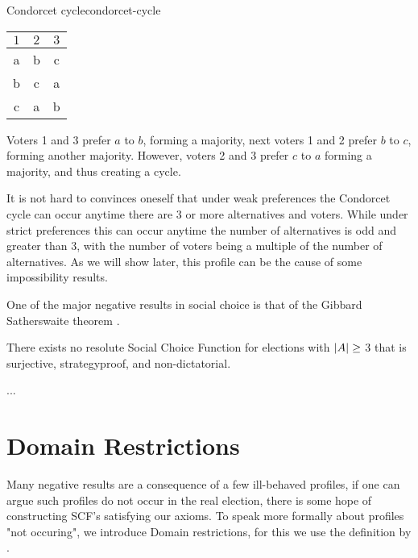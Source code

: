 \begin{example}{Condorcet cycle}{condorcet-cycle}
	\begin{minipage}{0.15\linewidth}
		\begin{tabular}{ccc}
			\toprule
			$1$ & $2$ & $3$ \\
			\midrule
			a   & b   & c   \\
			b   & c   & a   \\
			c   & a   & b   \\
			\bottomrule
		\end{tabular}
	\end{minipage}
	\hspace{0.02\linewidth}
	\begin{minipage}{0.78\linewidth}
		Voters 1 and 3  prefer $a$ to $b$, forming a majority, next voters 1 and 2 prefer $b$ to $c$, forming another majority. However, voters 2 and 3 prefer $c$ to $a$ forming a majority, and thus creating a cycle.
	\end{minipage}
\end{example}

It is not hard to convinces oneself that under weak preferences the Condorcet cycle can occur anytime there are 3 or more alternatives and voters. While under strict preferences this can occur anytime the number of alternatives is odd and greater than 3, with the number of voters being a multiple of the number of alternatives. As we will show later, this profile can be the cause of some impossibility results.

One of the major negative results in social choice is that of the Gibbard Satherswaite theorem \citep{gibbardManipulationVotingSchemes1973,satterthwaiteStrategyproofnessArrowsConditions1975}.

\begin{theorem}
	There exists no resolute Social Choice Function for elections with $|A| \geq$ 3 that is surjective, strategyproof, and non-dictatorial.
\end{theorem}

\begin{proofc}
	...
\end{proofc}

\section{Domain Restrictions}
\label{sec: Domain-res}
Many negative results are a consequence of a few ill-behaved profiles, if one can argue such profiles do not occur in the real election, there is some hope of constructing SCF's satisfying our axioms. To speak more formally about profiles "not occuring", we introduce Domain restrictions, for this we use the definition by \citet{elkindPreferenceRestrictionsComputational2022}.


